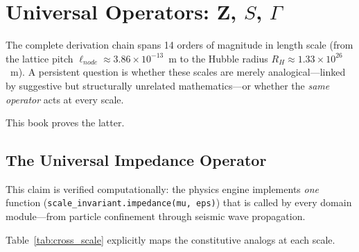 
\chapter{Universal Operators: Z, $S$, $\Gamma$}
\label{ch:universal_operators}

The complete derivation chain spans 14 orders of magnitude
in length scale (from the lattice pitch $\ell_{node} \approx 3.86 \times
10^{-13}$~m to the Hubble radius $R_H \approx 1.33 \times 10^{26}$~m).
A persistent question is whether these scales are merely analogical---linked
by suggestive but structurally unrelated mathematics---or whether the
\textit{same operator} acts at every scale.

This book proves the latter.

\section{The Universal Impedance Operator}
\label{sec:universal_impedance}

\noindent{}

\medskip
\noindent
This claim is verified computationally: the physics engine implements
\textit{one} function (\texttt{scale\_invariant.impedance(mu, eps)}) that
is called by every domain module---from particle confinement through
seismic wave propagation.

Table~\ref{tab:cross_scale} explicitly maps the constitutive analogs at
each scale.

